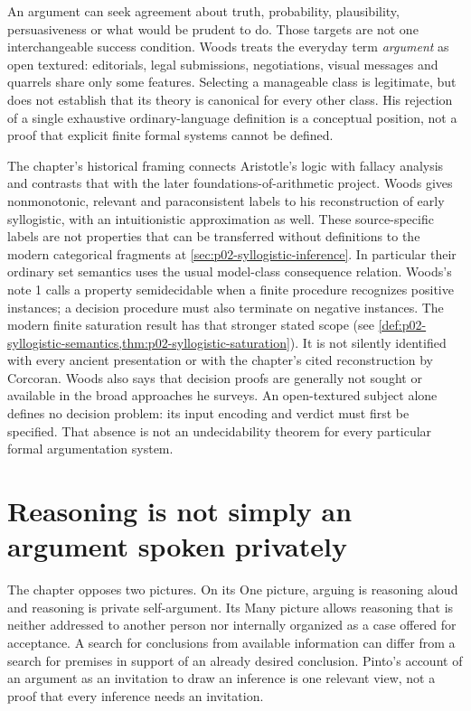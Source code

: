 An argument can seek agreement about truth, probability, plausibility,
persuasiveness or what would be prudent to do. Those targets are not
one interchangeable success condition. Woods treats the everyday term
\emph{argument} as open textured: editorials, legal submissions,
negotiations, visual messages and quarrels share only some features.
Selecting a manageable class is legitimate, but does not establish
that its theory is canonical for every other class. His rejection of
a single exhaustive ordinary-language definition is a conceptual
position, not a proof that explicit finite formal systems cannot be defined.

The chapter's historical framing connects Aristotle's logic with fallacy
analysis and contrasts that with the later foundations-of-arithmetic
project. Woods gives nonmonotonic, relevant and paraconsistent labels
to his reconstruction of early syllogistic, with an intuitionistic
approximation as well. These source-specific labels are not properties
that can be transferred without definitions to the modern categorical
fragments at \cref{sec:p02-syllogistic-inference}. In particular their
ordinary set semantics uses the usual model-class consequence relation.
Woods's note 1 calls a property semidecidable when a finite procedure
recognizes positive instances; a decision procedure must also terminate
on negative instances. The modern finite saturation result has that
stronger stated scope
(see \cref{def:p02-syllogistic-semantics,thm:p02-syllogistic-saturation}).
It is not silently identified with every ancient presentation or with
the chapter's cited reconstruction by Corcoran.
Woods also says that decision proofs are generally not sought or available
in the broad approaches he surveys. An open-textured subject alone
defines no decision problem: its input encoding and verdict must first
be specified. That absence is not an undecidability theorem for every
particular formal argumentation system.

\section{Reasoning is not simply an argument spoken privately}

The chapter opposes two pictures. On its One picture, arguing is reasoning
aloud and reasoning is private self-argument. Its Many picture allows
reasoning that is neither addressed to another person nor internally
organized as a case offered for acceptance. A search for conclusions
from available information can differ from a search for premises in
support of an already desired conclusion. Pinto's account of an argument
as an invitation to draw an inference is one relevant view, not a
proof that every inference needs an invitation.

